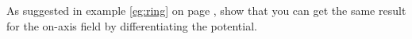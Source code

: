 As suggested in example \ref{eg:ring} on page \pageref{eg:ring},
        show that you can get the same result for the on-axis field
        by differentiating the potential.
